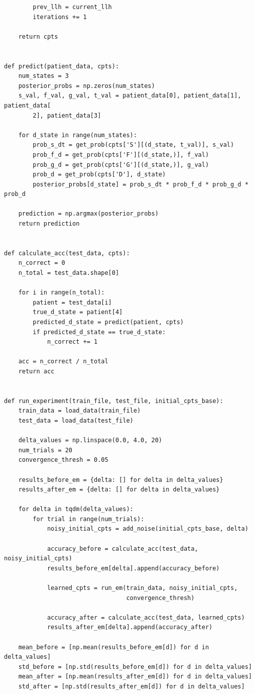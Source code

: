 \documentclass[11pt]{article}
\begin{document}
\begin{verbatim}
        prev_llh = current_llh
        iterations += 1

    return cpts


def predict(patient_data, cpts):
    num_states = 3
    posterior_probs = np.zeros(num_states)
    s_val, f_val, g_val, t_val = patient_data[0], patient_data[1], patient_data[
        2], patient_data[3]

    for d_state in range(num_states):
        prob_s_dt = get_prob(cpts['S'][(d_state, t_val)], s_val)
        prob_f_d = get_prob(cpts['F'][(d_state,)], f_val)
        prob_g_d = get_prob(cpts['G'][(d_state,)], g_val)
        prob_d = get_prob(cpts['D'], d_state)
        posterior_probs[d_state] = prob_s_dt * prob_f_d * prob_g_d * prob_d

    prediction = np.argmax(posterior_probs)
    return prediction


def calculate_acc(test_data, cpts):
    n_correct = 0
    n_total = test_data.shape[0]

    for i in range(n_total):
        patient = test_data[i]
        true_d_state = patient[4]
        predicted_d_state = predict(patient, cpts)
        if predicted_d_state == true_d_state:
            n_correct += 1

    acc = n_correct / n_total
    return acc


def run_experiment(train_file, test_file, initial_cpts_base):
    train_data = load_data(train_file)
    test_data = load_data(test_file)

    delta_values = np.linspace(0.0, 4.0, 20)
    num_trials = 20
    convergence_thresh = 0.05

    results_before_em = {delta: [] for delta in delta_values}
    results_after_em = {delta: [] for delta in delta_values}

    for delta in tqdm(delta_values):
        for trial in range(num_trials):
            noisy_initial_cpts = add_noise(initial_cpts_base, delta)

            accuracy_before = calculate_acc(test_data, noisy_initial_cpts)
            results_before_em[delta].append(accuracy_before)

            learned_cpts = run_em(train_data, noisy_initial_cpts,
                                  convergence_thresh)

            accuracy_after = calculate_acc(test_data, learned_cpts)
            results_after_em[delta].append(accuracy_after)

    mean_before = [np.mean(results_before_em[d]) for d in delta_values]
    std_before = [np.std(results_before_em[d]) for d in delta_values]
    mean_after = [np.mean(results_after_em[d]) for d in delta_values]
    std_after = [np.std(results_after_em[d]) for d in delta_values]


\end{verbatim}
\end{document}
